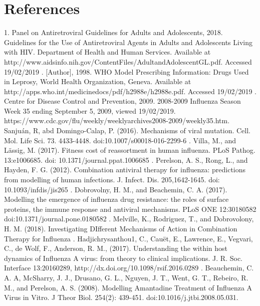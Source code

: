 \documentclass[a4paper,11pt]{article}
\begin{document}
\section*{References}
\small{1. Panel on Antiretroviral Guidelines for Adults and Adolescents, 2018. Guidelines for the Use of Antiretroviral Agents in Adults and Adolescents Living with HIV. Department of Health and Human Services. Available at http://www.aidsinfo.nih.gov/ContentFiles/AdultandAdolescentGL.pdf. Accessed 19/02/2019 . [Author], 1998. WHO Model Prescribing Information: Drugs Used in Leprosy, World Health Organization, Geneva. Available at http://apps.who.int/medicinedocs/pdf/h2988e/h2988e.pdf. Accessed 19/02/2019 . Centre for Disease Control and Prevention, 2009. 2008-2009 Influenza Season Week 35 ending September 5, 2009, viewed 19/02/2019. https://www.cdc.gov/flu/weekly/weeklyarchives2008-2009/weekly35.htm. Sanju\'an, R, abd Domingo-Calap, P. (2016). Mechanisms of viral mutation. Cell. Mol. Life Sci. 73. 4433-4448. doi:10.1007/s00018-016-2299-6 . Villa, M., and L\"assig, M. (2017). Fitness cost of reassortment in human influenza. PLoS Pathog. 13:e1006685. doi: 10.1371/journal.ppat.1006685 . Perelson, A. S., Rong, L., and Hayden, F. G. (2012). Combination antiviral therapy for influenza: predictions from modelling of human infections. J. Infect. Dis. 205,1642-1645. doi: 10.1093/infdis/jis265 . Dobrovolny, H. M., and Beachemin, C. A. (2017). Modelling the emergence of influenza drug resistance: the roles of surface proteins, the immune response and antiviral mechanisms. PLoS ONE 12:30180582 doi:10.1371/journal.pone.0180582 . Melville, K., Rodriguez, T., and Dobrovolony, H. M. (2018). Investigating DIfferent Mechanisms of Action in Combination Therapy for Influenza . Hadjichrysanthou1, C., Cau\"et, E., Lawrence, E., Vegvari, C., de Wolf, F., Anderson, R. M., (2017). Understanding the within host dynamics of Influenza A virus: from theory to clinical implications. J. R. Soc. Interface 13:20160289, http://dx.doi.org/10.1098/rsif.2016.0289 . Beauchemin, C. A. A, McSharry, J. J., Drusano, G. L., Nguyen, J. T., Went, G. T., Rebeiro, R. M., and Perelson, A. S. (2008). Modelling Amantadine Treatment of Influenza A Virus in  Vitro. J Theor Biol. 254(2): 439-451. doi:10.1016/j.jtbi.2008.05.031.\newline 
}
\end{document}
